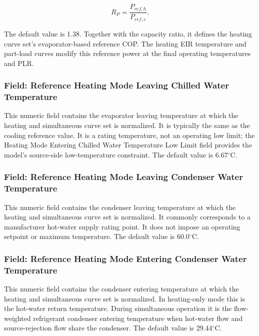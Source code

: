 \begin{equation}
R_P=\frac{P_{ref,h}}{P_{ref,c}}.
\end{equation}

The default value is 1.38. Together with the capacity ratio, it defines the heating curve set's evaporator-based reference COP. The heating EIR temperature and part-load curves modify this reference power at the final operating temperatures and PLR.

\subsubsection{Field: Reference Heating Mode Leaving Chilled Water Temperature}\label{field-reference-heating-mode-leaving-chilled-water-temperature}

This numeric field contains the evaporator leaving temperature at which the heating and simultaneous curve set is normalized. It is typically the same as the cooling reference value. It is a rating temperature, not an operating low limit; the Heating Mode Entering Chilled Water Temperature Low Limit field provides the model's source-side low-temperature constraint. The default value is 6.67$^\circ$C.

\subsubsection{Field: Reference Heating Mode Leaving Condenser Water Temperature}\label{field-reference-heating-mode-leaving-condenser-water-temperature}

This numeric field contains the condenser leaving temperature at which the heating and simultaneous curve set is normalized. It commonly corresponds to a manufacturer hot-water supply rating point. It does not impose an operating setpoint or maximum temperature. The default value is 60.0$^\circ$C.

\subsubsection{Field: Reference Heating Mode Entering Condenser Water Temperature}\label{field-reference-heating-mode-entering-condenser-water-temperature}

This numeric field contains the condenser entering temperature at which the heating and simultaneous curve set is normalized. In heating-only mode this is the hot-water return temperature. During simultaneous operation it is the flow-weighted refrigerant condenser entering temperature when hot-water flow and source-rejection flow share the condenser. The default value is 29.44$^\circ$C.

